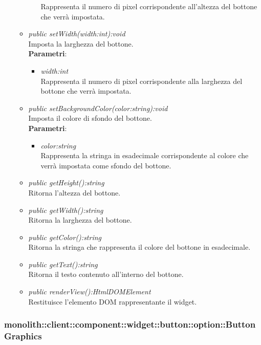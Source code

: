 \begin{itemize}
\begin{itemize}
\begin{itemize}
		Rappresenta il numero di pixel corrispondente all'altezza del bottone che verrà impostata.
		\end{itemize}
	\item \textit{public setWidth(width:int):void}\\
	Imposta la larghezza del bottone.
		\\ \textbf{Parametri}: \begin{itemize}
		\item \textit{width:int}\\
		Rappresenta il numero di pixel corrispondente alla larghezza del bottone che verrà impostata.
		\end{itemize}
	\item \textit{public setBackgroundColor(color:string):void}\\
	Imposta il colore di sfondo del bottone.
		\\ \textbf{Parametri}: \begin{itemize}
		\item \textit{color:string}\\
		Rappresenta la stringa in esadecimale corrispondente al colore che verrà impostata come sfondo del bottone.
		\end{itemize}
	\item \textit{public getHeight():string}\\
	Ritorna l'altezza del bottone.
	\item \textit{public getWidth():string}\\
	Ritorna la larghezza del bottone.
	\item \textit{public getColor():string}\\
	Ritorna la stringa che rappresenta il colore del bottone in esadecimale.
	\item \textit{public getText():string}\\
	Ritorna il testo contenuto all'interno del bottone.
	\item \textit{public renderView():HtmlDOMElement}\\
	Restituisce l'elemento DOM rappresentante il widget.
	\end{itemize}
\end{itemize}

\subsubsection{monolith::client::component::widget::button::option::ButtonGraphics}

